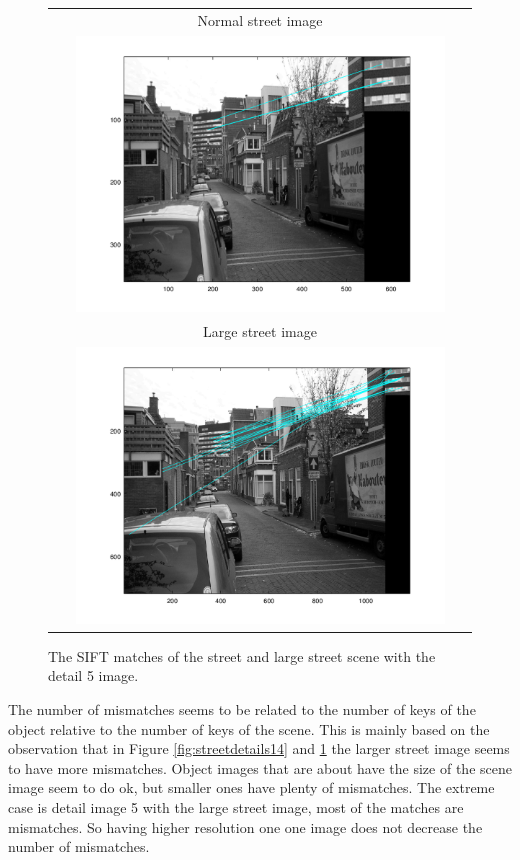 \documentclass[11pt,a4paper]{article}
\begin{document}
\begin{figure}
\centering
\begin{tabular}{c}
    Normal street image \\
    \includegraphics[width=0.9\textwidth]{./img/street-d5-match.png} \\
    Large street image \\
    \includegraphics[width=0.9\textwidth]{./img/streetlarge-d5-match.png} \\
\end{tabular}
\caption{The SIFT matches of the street and large street scene with the detail 5 image.}
\label{fig:streetdetails5}
\end{figure}

The number of mismatches seems to be related to the number of keys of the object relative to the number of keys of the scene.
This is mainly based on the observation that in Figure \ref{fig:streetdetails14} and \ref{fig:streetdetails5} the larger street image seems to have more mismatches.
Object images that are about have the size of the scene image seem to do ok, but smaller ones have plenty of mismatches.
The extreme case is detail image 5 with the large street image, most of the matches are mismatches.
So having higher resolution one one image does not decrease the number of mismatches.
\end{document}
